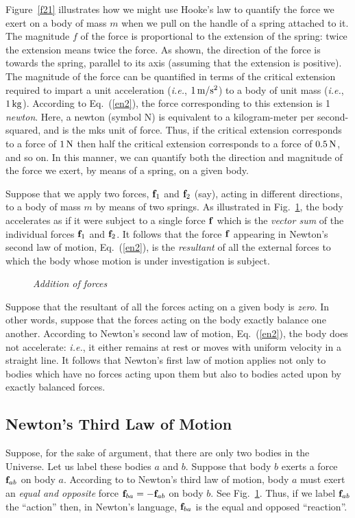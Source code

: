 Figure~\ref{f21} illustrates how we might use Hooke's law to quantify the force we exert
on a body of mass $m$ when we pull on the handle of
a spring attached to it. The magnitude $f$ of the force is proportional to the extension
of the spring: twice the extension means twice the force. As shown, the direction of the force
is towards the spring, parallel to its axis (assuming that the extension is positive). 
The magnitude of the force can be quantified in terms of the critical extension required to
impart  a unit acceleration
({\em i.e.}, $1\,{\rm m/s^2}$) to a body of unit mass ({\em i.e.}, $1\,{\rm kg}$).
 According to Eq.~(\ref{en2}), the force corresponding
to this extension is  1 {\em newton}. Here, a newton (symbol N) is
equivalent to a kilogram-meter per second-squared, and is the mks unit of force. Thus,
if the critical extension corresponds to a force of $1\,{\rm N}$ then half the critical
extension corresponds to a force of $0.5\,{\rm N}$, and so on. In this manner, we
can quantify both the direction and magnitude of the force we exert, by means of a spring,
on a given body.

Suppose that we apply two forces, ${\bf f}_1$ and ${\bf f}_2$ (say), acting in different directions,
to a body of mass $m$ by means of two springs. As illustrated in Fig.~\ref{f22}, the body accelerates
as if it were subject to a single force ${\bf f}$ which is the {\em vector sum} of the individual
forces ${\bf f}_1$ and ${\bf f}_2$. It follows that the force ${\bf f}$ appearing in
Newton's second law of motion, Eq.~(\ref{en2}), is the {\em resultant} of all the external forces to which
the body whose motion is under investigation is subject.

\begin{figure}
\epsfysize=2.5in
\centerline{}
\caption{\em Addition of forces}\label{f22}   
\end{figure}

Suppose that the resultant of all the forces acting on a given body is {\em zero}. In other words,
suppose that the forces acting on the body exactly balance one another. According to Newton's second law of motion,
Eq.~(\ref{en2}), the body does not accelerate: {\em i.e.}, it either remains at rest or
moves with uniform velocity in a straight line. It follows that Newton's first law
of motion applies not only to bodies which have no forces acting upon them but also to
bodies acted upon by exactly balanced forces.

\subsection{Newton's Third Law of Motion}
Suppose, for the sake of argument, that there are only two bodies in the Universe. Let
us label these bodies $a$ and $b$. Suppose that body $b$ exerts a force ${\bf f}_{ab}$ on body $a$.
According to to Newton's third law of motion,  body $a$ must exert an
{\em equal and opposite} force ${\bf f}_{ba}=-{\bf f}_{ab}$ on body $b$. See Fig.~\ref{f22}. 
Thus, if we label ${\bf f}_{ab}$ the ``action'' then, in Newton's language, ${\bf f}_{ba}$
is the equal and opposed ``reaction''.

